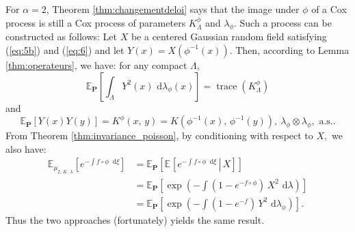 \documentclass[11pt,a4paper]{amsart}
\begin{document}
For $\alpha=2$, Theorem \ref{thm:changementdeloi} says that the image
under $\phi$ of a Cox process is still a Cox process of parameters
$K_\Lambda^\phi$ and $\lambda_\phi$. Such a process can be constructed
as follows: Let $X$ be a centered Gaussian random field satisfying
(\ref{eq:5b}) and (\ref{eq:6}) and let $Y(x)=X(\phi^{-1}(x))$.  Then,
according to Lemma \ref{thm:operateurs}, we have: for any compact
$\Lambda$,
\begin{equation*}
  {{\mathbb E}_{{{\mathbf P}}}\left[{{\int_\Lambda Y^2(x){\text{ d}}\lambda_\phi(x)}}\right]}={\operatorname{trace}}(K_\Lambda^\phi)
\end{equation*}
and
\begin{equation*}
  {{\mathbb E}_{{{\mathbf P}}}\left[{{Y(x)Y(y)}}\right]}=K^\phi(x,\, y)=K(\phi^{-1}(x),\,
  \phi^{-1}(y)),\ \lambda_\phi\otimes \lambda_\phi, \text{ a.s..}
\end{equation*}
From Theorem \ref{thm:invariance_poisson}, by conditioning with
respect to $X,$ we also have:
\begin{align*}
  {{\mathbb E}}_{\mu_{2,\, K,\, \lambda}} \left[ e^{- \int{f\circ \phi \ {\text{ d}}\xi}}
  \right]&={{\mathbb E}_{{{\mathbf P}}}\left[{{{{\mathbb E}_{{}}\left[{{\left. e^{- \int{f\circ
            \phi
            \ {\text{ d}}\xi}}\,\right|\, X}}\right]}}}\right]}\\
  &={{\mathbb E}_{{{\mathbf P}}}\left[{{\exp\left(-\int (1-e^{-f\circ \phi}) \, X^2{\text{ d}} \lambda\right)}}\right]}\\
  &={{\mathbb E}_{{{\mathbf P}}}\left[{{\exp\left(-\int (1-e^{-f}) \, Y^2{\text{ d}} \lambda_\phi\right)}}\right]}.
\end{align*}
Thus the two approaches (fortunately) yields the same result.
\end{document}
